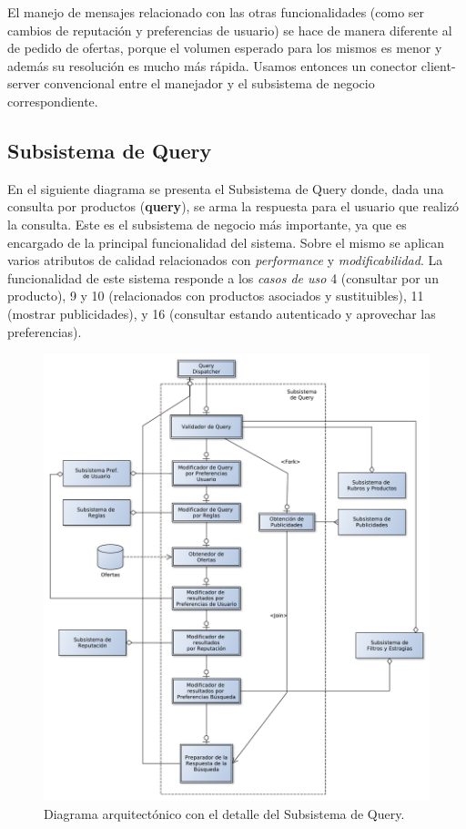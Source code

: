 El manejo de mensajes relacionado con las otras funcionalidades (como ser cambios de reputaci\'on y preferencias de usuario) se hace de manera diferente al de pedido de ofertas, porque el volumen esperado para los mismos es menor y además su resoluci\'on es mucho más r\'apida. Usamos entonces un conector client-server convencional entre el \textsf{manejador} y el \textsf{subsistema de negocio} correspondiente.


\subsection{Subsistema de Query}

En el siguiente diagrama se presenta el \textsf{Subsistema de Query} donde, dada una consulta por productos (\textbf{query}), se arma la respuesta para el usuario que realizó la consulta. Este es el \textsf{subsistema de negocio} más importante, ya que es encargado de la principal funcionalidad del sistema. Sobre el mismo se aplican varios atributos de calidad relacionados con \emph{performance} y \emph{modificabilidad}. La funcionalidad de este sistema responde a los \emph{casos de uso} 4 (consultar por un producto), 9 y 10 (relacionados con productos asociados y sustituibles), 11 (mostrar publicidades), y 16 (consultar estando autenticado y aprovechar las preferencias).


\begin{figure}[H]
	\centering
	\includegraphics[width=\textwidth]{graficos/arch/subsistema_query.pdf}
	\caption{Diagrama arquitectónico con el detalle del \textsf{Subsistema de Query}.}
\end{figure}

